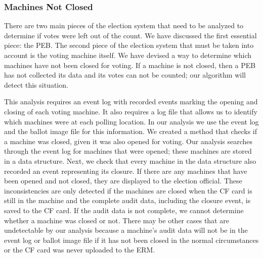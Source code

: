 \subsubsection{Machines Not Closed}
There are two main pieces of the election system that need to be
analyzed to determine if votes were left out of the count.  We have
discussed the first essential piece: the PEB.  The second piece of the
election system that must be taken into account is the voting machine
itself.   We have devised a way to determine which machines have not
been closed for voting.  If a machine is not closed, then a PEB has
not collected its data and its votes can not be counted; our algorithm
will  detect this situation.   

This analysis requires an event log with recorded events marking the
opening and closing of each voting machine. It also requires a log
file that allows us to identify which machines were at each polling
location. In our analysis we use the event log and the ballot image
file for this information. We created a method that checks if a
machine was closed, given it was also opened for voting.  Our analysis
searches through the event log for machines that were opened; these
machines are stored in a data structure.  Next, we check that every
machine in the data structure also recorded an event representing its
closure.  If there are any machines that have been opened and not
closed, they are displayed to the election official.  These
inconsistencies are only detected if the machines are closed when the
CF card is still in the machine and the complete audit data, including
the closure event, is saved to the CF card.  If the audit data is not
complete, we cannot determine whether a machine was closed or not.
There may be other cases that are undetectable by our analysis because
a machine's audit data will not be in the event log or ballot image
file if it has not been closed in the normal circumstances or the CF
card was never uploaded to the ERM.  
